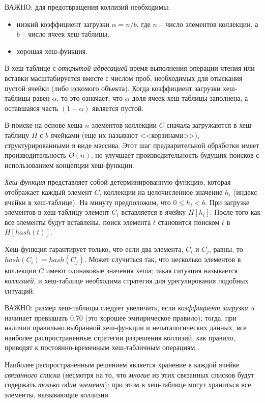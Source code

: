 \documentclass[%
	11pt,
	a4paper,
	utf8,
		]{article}
\begin{document}
ВАЖНО: для предотвращения коллизий необходимы:
\begin{itemize}
	\item низкий коэффициент загрузки $ \alpha = n/b $, где $ n $ -- число элементов коллекции, а $ b $ -- число ячеек хеш-таблицы,
	
	\item хорошая хеш-функция.
\end{itemize}

В хеш-таблице с \emph{открытой адресацией} время выполнения операции чтения или вставки масштабируется вместе с числом проб, необходимых для отыскания пустой ячейки (либо искомого объекта). Когда коэффициент загрузки хеш-таблицы равен $ \alpha $, то это означает, что $ \alpha $-доля ячеек хеш-таблицы заполнена, а оставшаяся часть $ (1 - \alpha) $ является пустой.

В поиске на основе хеша $ n $ элементов коллекции $ C $ сначала загружаются в хеш-таблицу $ H $ с $ b $ ячейками (еще их называют <<корзинами>>), структурированными в виде массива. Этот шаг предварительной обработки имеет производительность $ O(n) $, но улучшает производительность будущих поисков с использованием концепции хеш-функции. 

\emph{Хеш-функция} представляет собой детерминированную функцию, которая отображает каждый элемент $ C_i $ коллекции на целочисленное значение $ h_i $ (индекс ячейки в хеш-таблице). На минуту предположим, что $ 0 \leqslant h_i < b $. При загрузке элементов в хеш-таблицу элемент $ C_i $ вставляется в ячейку $ H[h_i] $. После того как все элементы будут вставлены, поиск элемента $ t $ становится поиском $ t $ в $ H[hash(t)] $.

Хеш-функция гарантирует только, что если два элемента, $ C_i $ и $ C_j $, равны, то $ hash(C_i) = hash(C_j) $. Может случиться так, что несколько элементов в коллекции $ C $ имеют одинаковые значения хеша; такая ситуация называется \emph{коллизией}, и хеш-таблице необходима стратегия для урегулирования подобных ситуаций.

ВАЖНО: размер хеш-таблицы следует увеличить, если \emph{коэффициент загрузки} $ \alpha $ начинает превышать 0.70 (это хорошее эмпирическое правило); тогда, при наличии правильно выбранной хеш-функции и непаталогических данных, все наиболее распространенные стратегии разрешения коллизий, как правило, приводят к постоянно-временным хеш-табличным операциям \cite[225]{roughgarden-graph:2019}.

Наиболее распространенным решением является хранение в каждой ячейке \emph{связанного списка} (несмотря на то, что \emph{многие} из этих связанных списков будут содержать \emph{только один элемент}); при этом в хеш-таблице могут храниться все элементы, вызывающие коллизии.
\end{document}
